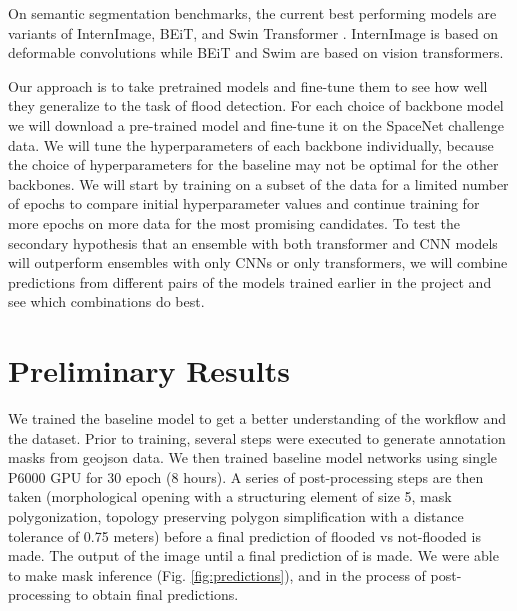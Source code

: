 \documentclass[10pt,twocolumn,letterpaper]{article}
\begin{document}
On semantic segmentation benchmarks, the current best performing models are variants of InternImage, BEiT, and Swin Transformer \cite{paperswithcode_segmentation}. InternImage is based on deformable convolutions \cite{wang2023internimage} while BEiT \cite{bao2022beit} and Swim \cite{liu2021swin} are based on vision transformers.

Our approach is to take pretrained models and fine-tune them to see how well they generalize to the task of flood detection.
For each choice of backbone model we will download a pre-trained model and fine-tune it on the SpaceNet challenge data. We will tune the hyperparameters of each backbone individually, because the choice of hyperparameters for the baseline may not be optimal for the other backbones. We will start by training on a subset of the data for a limited number of epochs to compare initial hyperparameter values and continue training for more epochs on more data for the most promising candidates. To test the secondary hypothesis that an ensemble with both transformer and CNN models will outperform ensembles with only CNNs or only transformers, we will combine predictions from different pairs of the models trained earlier in the project and see which combinations do best.


\section{Preliminary Results}

We trained the baseline model to get a better understanding of the workflow and the dataset. Prior to training, several steps were executed to generate annotation masks from geojson data. We then trained baseline model networks using single P6000 GPU for 30 epoch (8 hours).
A series of post-processing steps are then taken (morphological opening with a structuring element of size 5, mask polygonization, topology preserving polygon simplification with a distance tolerance of 0.75 meters) before a final prediction of flooded vs not-flooded is made. The output of the image  \cite{spacenet8} until a final prediction of is made. We were able to make mask inference (Fig. \ref{fig:predictions}), and in the process of post-processing to obtain final predictions. 
\end{document}
